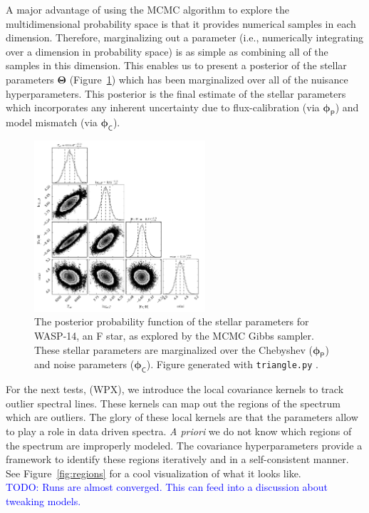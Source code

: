 \documentclass[iop,floatfix]{emulateapj}
\newcommand{\vT}{ {\bm \Theta}}
\newcommand{\vp}{ {\bm \phi}}
\newcommand{\cheb}{ \vp_{\mathsf{P}}}
\newcommand{\cov}{ \vp_{\mathsf{C}}}
\newcommand{\todo}[1]{ \textcolor{blue}{\\TODO: #1}}
\begin{document}
A major advantage of using the MCMC algorithm to explore the multidimensional probability space is that it provides numerical samples in each dimension. Therefore, marginalizing out a parameter (i.e., numerically integrating over a dimension in probability space) is as simple as combining all of the samples in this dimension. This enables us to present a posterior of the stellar parameters $\vT$ (Figure~\ref{fig:stellar_posterior}) which has been marginalized over all of the nuisance hyperparameters. This posterior is the final estimate of the stellar parameters which incorporates any inherent uncertainty due to flux-calibration (via $\cheb$) and model mismatch (via $\cov$).

\begin{figure}[!htb]
\begin{center}
  \includegraphics[draft, width=2.5in]{figs/stellar_triangle_Kurucz.png}
  \caption{The posterior probability function of the stellar parameters for WASP-14, an F star, as explored by the MCMC Gibbs sampler. These stellar parameters are marginalized over the Chebyshev ($\cheb$) and noise parameters ($\cov$). Figure generated with \texttt{triangle.py} \citep{foreman-mackey14}.
}
\label{fig:stellar_posterior}
\end{center}
\end{figure}

For the next tests, (WPX), we introduce the local covariance kernels to track outlier spectral lines. These kernels can map out the regions of the spectrum which are outliers. The glory of these local kernels are that the parameters allow to play a role in data driven spectra. \emph{A priori} we do not know which regions of the spectrum are improperly modeled. The covariance hyperparameters provide a framework to identify these regions iteratively and in a self-consistent manner.  See Figure~\ref{fig:regions} for a cool visualization of what it looks like. \todo{Runs are almost converged. This can feed into a discussion about tweaking models.}
\end{document}
